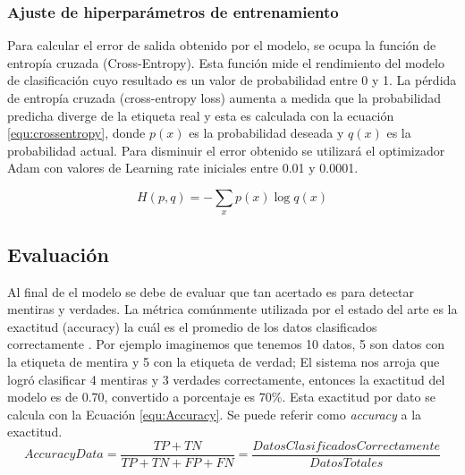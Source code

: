 \begin{onehalfspacing}
\subsubsection{Ajuste de hiperparámetros de entrenamiento}
\label{sec:ajustehiperparametros}
Para calcular el error de salida obtenido por el modelo, se ocupa la función de entropía cruzada (Cross-Entropy). Esta función mide el rendimiento del modelo de clasificación cuyo resultado es un valor de probabilidad entre 0 y 1. La pérdida de entropía cruzada (cross-entropy loss) aumenta a medida que la probabilidad predicha diverge de la etiqueta real y esta es calculada con la ecuación \ref{equ:crossentropy}, donde $p(x)$ es la probabilidad deseada y $q(x)$ es la probabilidad actual. Para disminuir el error obtenido se utilizará el optimizador Adam con valores de Learning rate iniciales entre 0.01 y 0.0001.

\begin{equation}
\label{equ:crossentropy}
    H(p,q) = -\sum_{x}p(x)\log q(x)
\end{equation}



\subsection{Evaluación}
\label{sec:Evaluacion}

Al final de el modelo se debe de evaluar que tan acertado es para detectar mentiras y verdades. La métrica comúnmente utilizada por el estado del arte es la exactitud (accuracy) la cuál es el promedio de los datos clasificados correctamente \cite{Bond2006AccuracyJudgments,Vrij2000DetectingBehavior,Perez-Rosas2015VerbalDetection,KrishnamurthyADetection}. Por ejemplo imaginemos que tenemos 10 datos, 5 son datos con la etiqueta de mentira y 5 con la etiqueta de verdad; El sistema nos arroja que logró clasificar 4 mentiras y 3 verdades correctamente, entonces la exactitud del modelo es de 0.70, convertido a porcentaje es 70\%. Esta exactitud por dato se calcula con la Ecuación \ref{equ:Accuracy}. Se puede referir como \textit{accuracy} a la exactitud.\\

\begin{equation}
\label{equ:Accuracy}
    AccuracyData = \frac{TP+TN}{TP+TN+FP+FN} = \frac{DatosClasificadosCorrectamente}{DatosTotales}
\end{equation}\\



\end{onehalfspacing}
